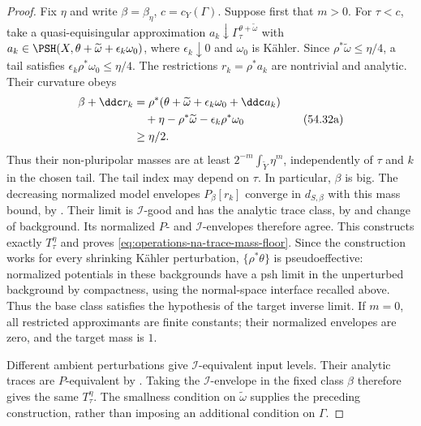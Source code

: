 \begin{proof}
Fix $\eta$ and write $\beta=\beta_\eta$, $c=c_Y(\Gamma)$.
Suppose first that $m>0$.
For $\tau<c$, take a quasi-equisingular approximation
$a_k\downarrow\Gamma_\tau^{\theta+\widetilde\omega}$ with
$a_k\in\PSH(X,\theta+\widetilde\omega+\epsilon_k\omega_0)$,
where $\epsilon_k\downarrow0$ and $\omega_0$ is K\"ahler.
Since $\rho^*\widetilde\omega\leq\eta/4$, a tail satisfies
$\epsilon_k\rho^*\omega_0\leq\eta/4$.
The restrictions $r_k=\rho^*a_k$ are nontrivial and analytic.
Their curvature obeys
\[
 \begin{split}
 \beta+\ddc r_k
 &=\rho^*(\theta+\widetilde\omega+\epsilon_k\omega_0+\ddc a_k)\\
 &\quad+\eta-\rho^*\widetilde\omega-\epsilon_k\rho^*\omega_0\\
 &\geq\eta/2.
 \end{split}
\tag{54.32a}\label{eq:operations-na-trace-curvature-margin}
\]
Thus their non-pluripolar masses are at least
$2^{-m}\int_{\widetilde Y}\eta^m$, independently of $\tau$ and $k$
in the chosen tail.  The tail index may depend on $\tau$.
In particular, $\beta$ is big.
The decreasing normalized model envelopes $P_\beta[r_k]$ converge
in $d_{S,\beta}$ with this mass bound, by
\cite[Corollary~6.2.7]{XiaBook}.
Their limit is $\mathcal I$-good and has the analytic trace class,
by  and change of background.
Its normalized $P$- and $\mathcal I$-envelopes therefore agree.
This constructs exactly $T_\tau^\eta$ and proves
\eqref{eq:operations-na-trace-mass-floor}.
Since the construction works for every shrinking K\"ahler perturbation,
$\{\rho^*\theta\}$ is pseudoeffective: normalized potentials in
these backgrounds have a psh limit in the unperturbed background by
compactness, using the normal-space interface recalled above.
Thus the base class satisfies the hypothesis of the target inverse limit.
If $m=0$, all restricted approximants are finite constants; their
normalized envelopes are zero, and the target mass is $1$.

Different ambient perturbations give $\mathcal I$-equivalent input
levels.  Their analytic traces are $P$-equivalent by
.
Taking the $\mathcal I$-envelope in the fixed class $\beta$
therefore gives the same $T_\tau^\eta$.
The smallness condition on $\widetilde\omega$ supplies the preceding
construction, rather than imposing an additional condition on $\Gamma$.


\end{proof}
